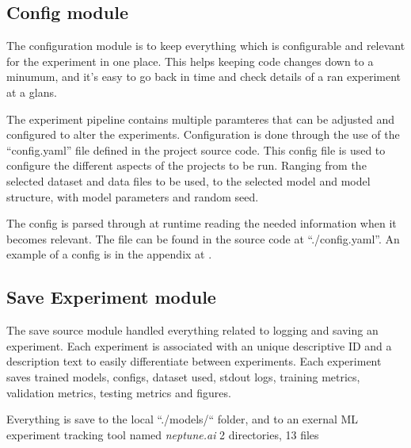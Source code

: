 

\subsection{Config module}
The configuration module is to keep everything which is configurable and relevant
for the experiment in one place. This helps keeping code changes down to a minumum,
and it's easy to go back in time and check details of a ran experiment at a glans.

The experiment pipeline contains multiple paramteres that can be adjusted and configured to alter the experiments.
Configuration is done through the use of the ``config.yaml'' file defined in the project source code.
This config file is used to configure the different aspects of the projects to be run.
Ranging from the selected dataset and data files to be used, to the selected model and model structure, with model parameters and random seed.

The config is parsed through at runtime reading the needed information when it becomes relevant.
The file can be found in the source code at ``./config.yaml''.
An example of a config is in the appendix at .

\subsection{Save Experiment module}
The save source module handled everything related to logging and saving an experiment.
Each experiment is associated with an unique descriptive ID and a description text to easily
differentiate between experiments.
Each experiment saves trained models, configs, dataset used, stdout logs, training metrics, validation metrics,
testing metrics and figures.

Everything is save to the local ``./models/`` folder, and to an exernal ML experiment tracking tool
named \textit{neptune.ai}
2 directories, 13 files
